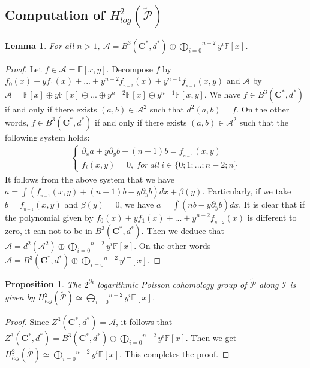 \documentclass[a4paper, 12pt,oneside,reqno]{amsart}
\newtheorem{lemma}[theorem]{Lemma}
\newtheorem{proposition}[theorem]{Proposition}
\theoremstyle{definition}
\begin{document}
 \subsection{Computation of $H_{log}^{2}(\tilde{\mathcal{P}})$}
 \begin{lemma} For all $n>1$,
$\mathcal{A}= B^{3}(\textbf{C}^{*},d^{*})\oplus \overset{n-2}{\underset{i=0}{\bigoplus}}y^{i} \mathbb{F}[x]$.
 \end{lemma}
\begin{proof}
Let $f\in \mathcal{A}=\mathbb{F}[x,y]$. Decompose $f$ by $f_{0}(x)+ yf_{1}(x) +...+y^{n-2}f_{_{n-2}}(x)+y^{n-1}f_{_{n-1}}(x,y)  $  and $\mathcal{A}$ by $\mathcal{A} = \mathbb{F}[x]\oplus y\mathbb{F}[x]\oplus ...\oplus y^{n-2} \mathbb{F}[x] \oplus y^{n-1}\mathbb{F}[x,y]$.
 We have $f\in B^{3}(\textbf{C}^{*},d^{*})$ if and only if there exists $(a,b)\in \mathcal{A}^{2}$ such that $d^{2}(a,b) = f$. On the other words, $f\in B^{3}(\textbf{C}^{*},d^{*})$ if and only if there exists $(a,b)\in \mathcal{A}^{2}$ such that the following system holds: 
   \begin{eqnarray} \label{E8}
  \left\{
  \begin{array}{rl}
   \partial_{x} a + y\partial_{y}b - (n-1)b=f_{_{n-1}}(x,y)    \\
   f_{i}(x,y) = 0, ~for~ all ~i\in \{0;1;...;n-2;n\}           
  \end{array}
   \right.
  \end{eqnarray}
  It  follows from the above system that we have $a= \int \left(f_{_{n-1}}(x,y) + (n-1)b-y\partial_{y}b\right)dx + \beta(y)$. Particularly, if we take $b=f_{_{n-1}}(x,y)$ and $\beta(y)=0$, we have $a=\int \left(nb-y\partial_{y} b\right)dx$. It is clear that if the polynomial given by  $f_{0}(x)+ yf_{1}(x) +...+y^{n-2}f_{_{n-2}}(x)$ is different to zero,  it can not to be in $B^{3}(\textbf{C}^{*},d^{*})$. Then we deduce that $\mathcal{A}= d^{2}(\mathcal{A} ^{2})\oplus \overset{n-2}{\underset{i=0}{\bigoplus}}y^{i} \mathbb{F}[x]$. On the other words $\mathcal{A}= B^{3}(\textbf{C}^{*},d^{*})\oplus \overset{n-2}{\underset{i=0}{\bigoplus}}y^{i} \mathbb{F}[x]$.
\end{proof}  
  \begin{proposition}
  The  $2^{th}$  logarithmic Poisson cohomology group of $\tilde{\mathcal{P}}$ along $\mathcal{I}$ is given by
  $H_{log}^{2}(\tilde{\mathcal{P}}) \simeq \overset{n-2}{\underset{i=0}{\bigoplus}}y^{i} \mathbb{F}[x]$.
   \end{proposition}
   \begin{proof}
   Since $Z^{3}(\textbf{C}^{*},d^{*})=\mathcal{A}$, it follows that  $Z^{3}(\textbf{C}^{*},d^{*})= B^{3}(\textbf{C}^{*},d^{*})\oplus \overset{n-2}{\underset{i=0}{\bigoplus}}y^{i} \mathbb{F}[x]$. Then we get $H_{log}^{2}(\tilde{\mathcal{P}}) \simeq \overset{n-2}{\underset{i=0}{\bigoplus}}y^{i} \mathbb{F}[x]$. 
This completes the proof.
   \end{proof}
   
\end{document}
